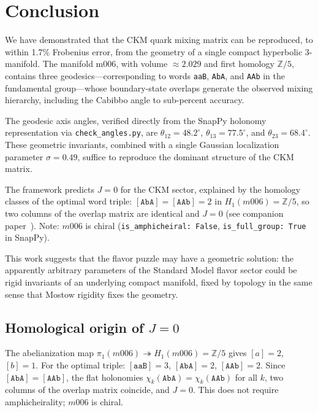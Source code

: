 \documentclass[11pt,a4paper]{article}
\begin{document}
\section{Conclusion}
\label{sec:conclusion}

We have demonstrated that the CKM quark mixing matrix can be reproduced, 
to within 1.7\% Frobenius error, from the geometry of a single compact 
hyperbolic 3-manifold. The manifold m006, with volume $\approx 2.029$ 
and first homology $\mathbb{Z}/5$, contains three geodesics---corresponding 
to words \texttt{aaB}, \texttt{AbA}, and \texttt{AAb} in the fundamental 
group---whose boundary-state overlaps generate the observed mixing 
hierarchy, including the Cabibbo angle to sub-percent accuracy.

The geodesic axis angles, verified directly from the SnapPy holonomy
representation via \texttt{check\_angles.py}, are
$\theta_{12} = 48.2^\circ$, $\theta_{13} = 77.5^\circ$,
and $\theta_{23} = 68.4^\circ$. These geometric invariants, combined
with a single Gaussian localization parameter $\sigma = 0.49$,
suffice to reproduce the dominant structure of the CKM matrix.

The framework predicts $J = 0$ for the CKM sector, explained by the homology classes of the optimal word triple: $[\texttt{AbA}] = [\texttt{AAb}] = 2$ in $H_1(m006)=\mathbb{Z}/5$, so two columns of the overlap matrix are identical and $J=0$ (see companion paper~\cite{Gentry:CP}). Note: $m006$ is chiral (\texttt{is\_amphicheiral: False}, \texttt{is\_full\_group: True} in SnapPy).

This work suggests that the flavor puzzle may have a geometric 
solution: the apparently arbitrary parameters of the Standard Model 
flavor sector could be rigid invariants of an underlying compact 
manifold, fixed by topology in the same sense that Mostow rigidity 
fixes the geometry.

\subsection*{Homological origin of $J=0$}
\label{subsec:hom_cp}
The abelianization map $\pi_1(m006)\twoheadrightarrow H_1(m006)=\mathbb{Z}/5$
gives $[a]=2$, $[b]=1$. For the optimal triple:
$[\texttt{aaB}]=3$, $[\texttt{AbA}]=2$, $[\texttt{AAb}]=2$.
Since $[\texttt{AbA}]=[\texttt{AAb}]$, the flat holonomies
$\chi_k(\texttt{AbA})=\chi_k(\texttt{AAb})$ for all $k$,
two columns of the overlap matrix coincide, and $J=0$.
This does not require amphicheirality; $m006$ is chiral.
\end{document}
